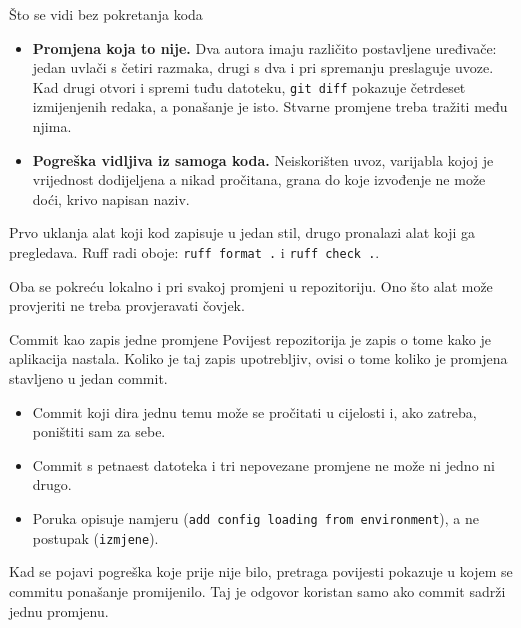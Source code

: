 \begin{frame}{Što se vidi bez pokretanja koda}
\begin{itemize}
  \item \textbf{Promjena koja to nije.} Dva autora imaju različito postavljene uređivače: jedan uvlači s četiri razmaka, drugi s dva i pri spremanju preslaguje uvoze. Kad drugi otvori i spremi tuđu datoteku, \texttt{git diff} pokazuje četrdeset izmijenjenih redaka, a ponašanje je isto. Stvarne promjene treba tražiti među njima.
  \item \textbf{Pogreška vidljiva iz samoga koda.} Neiskorišten uvoz, varijabla kojoj je vrijednost dodijeljena a nikad pročitana, grana do koje izvođenje ne može doći, krivo napisan naziv.
\end{itemize}

\vspace{0.5em}
Prvo uklanja alat koji kod zapisuje u jedan stil, drugo pronalazi alat koji ga pregledava. Ruff radi oboje: \texttt{ruff format .} i \texttt{ruff check .}.

\vspace{0.3em}
Oba se pokreću lokalno i pri svakoj promjeni u repozitoriju. Ono što alat može provjeriti ne treba provjeravati čovjek.
\end{frame}


\begin{frame}{Commit kao zapis jedne promjene}
Povijest repozitorija je zapis o tome kako je aplikacija nastala. Koliko je taj zapis upotrebljiv, ovisi o tome koliko je promjena stavljeno u jedan commit.

\begin{itemize}
  \item Commit koji dira jednu temu može se pročitati u cijelosti i, ako zatreba, poništiti sam za sebe.
  \item Commit s petnaest datoteka i tri nepovezane promjene ne može ni jedno ni drugo.
  \item Poruka opisuje namjeru (\texttt{add config loading from environment}), a ne postupak (\texttt{izmjene}).
\end{itemize}

\vspace{0.4em}
Kad se pojavi pogreška koje prije nije bilo, pretraga povijesti pokazuje u kojem se commitu ponašanje promijenilo. Taj je odgovor koristan samo ako commit sadrži jednu promjenu.
\end{frame}

